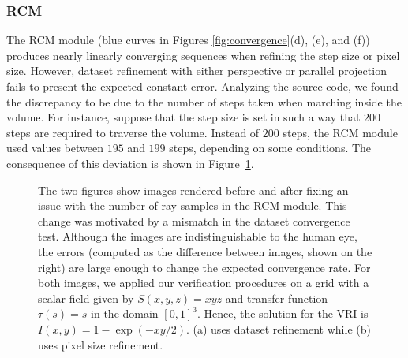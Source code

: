 \subsubsection{RCM}
The RCM module (blue curves in Figures \ref{fig:convergence}(d), (e),
and (f)) produces nearly linearly converging sequences when refining
the step size or pixel size.  However, dataset refinement with either
perspective or parallel projection fails to present the expected
constant error. Analyzing the source code, we found the
discrepancy to be due to the number of steps taken when marching
inside the volume. For instance, suppose that the step size is set in
such a way that $200$ steps are required to traverse the volume. Instead
of $200$ steps, the RCM module used values between $195$ and $199$ steps, depending on
some conditions.  The consequence of this deviation 
is shown in Figure~\ref{fig:problem-example-01}.

\begin{figure}[t]
\centering 
{}
\caption{\label{fig:problem-example-01} The two figures show images
  rendered before and after fixing an issue with the number of ray
  samples in the RCM module. This change was motivated by a mismatch
  in the dataset convergence test. Although the images are
  indistinguishable to the human eye, the errors (computed as the
  difference between images, shown on the right) are large enough to
  change the expected convergence rate. For both images, we applied our
  verification procedures on a grid with a scalar field given by
  $S(x,y,z) = xyz$ and transfer function $\tau(s) = s$ in the domain
  $\left[0,1\right]^3$. Hence, the solution for the VRI is $I(x,y) =
  1-\exp\left( -x y / 2 \right)$. (a) uses dataset refinement while
  (b) uses pixel size refinement.}
\end{figure}


